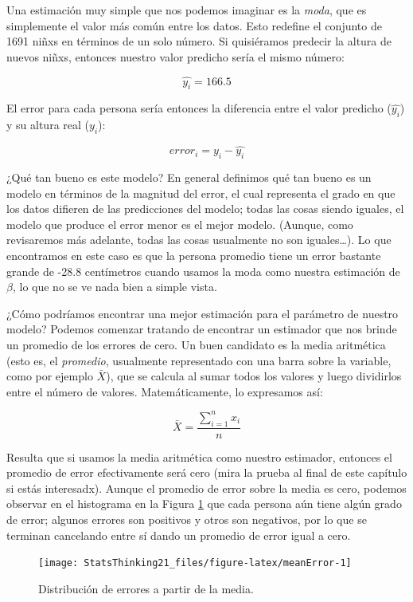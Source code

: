 \documentclass[
  12pt,
]{book}
\begin{document}
Una estimación muy simple que nos podemos imaginar es la \emph{moda}, que es simplemente el valor más común entre los datos. Esto redefine el conjunto de 1691 niñxs en términos de un solo número. Si quisiéramos predecir la altura de nuevos niñxs, entonces nuestro valor predicho sería el mismo número:

\[
\hat{y_i} = 166.5
\]

El error para cada persona sería entonces la diferencia entre el valor predicho (\(\hat{y_i}\)) y su altura real (\(y_i\)):

\[
error_i = y_i - \hat{y_i}
\]

¿Qué tan bueno es este modelo? En general definimos qué tan bueno es un modelo en términos de la magnitud del error, el cual representa el grado en que los datos difieren de las predicciones del modelo; todas las cosas siendo iguales, el modelo que produce el error menor es el mejor modelo. (Aunque, como revisaremos más adelante, todas las cosas usualmente no son iguales\ldots).
Lo que encontramos en este caso es que la persona promedio tiene un error bastante grande de -28.8 centímetros cuando usamos la moda como nuestra estimación de \(\beta\), lo que no se ve nada bien a simple vista.

¿Cómo podríamos encontrar una mejor estimación para el parámetro de nuestro modelo? Podemos comenzar tratando de encontrar un estimador que nos brinde un promedio de los errores de cero. Un buen candidato es la media aritmética (esto es, el \emph{promedio}, usualmente representado con una barra sobre la variable, como por ejemplo \(\bar{X}\)), que se calcula al sumar todos los valores y luego dividirlos entre el número de valores. Matemáticamente, lo expresamos así:

\[
\bar{X} = \frac{\sum_{i=1}^{n}x_i}{n}
\]

Resulta que si usamos la media aritmética como nuestro estimador, entonces el promedio de error efectivamente será cero (mira la prueba al final de este capítulo si estás interesadx). Aunque el promedio de error sobre la media es cero, podemos observar en el histograma en la Figura \ref{fig:meanError} que cada persona aún tiene algún grado de error; algunos errores son positivos y otros son negativos, por lo que se terminan cancelando entre sí dando un promedio de error igual a cero.

\begin{figure}
\texttt{[image: StatsThinking21\_files/figure-latex/meanError-1]} \caption{Distribución de errores a partir de la media.}\label{fig:meanError}
\end{figure}
\end{document}
